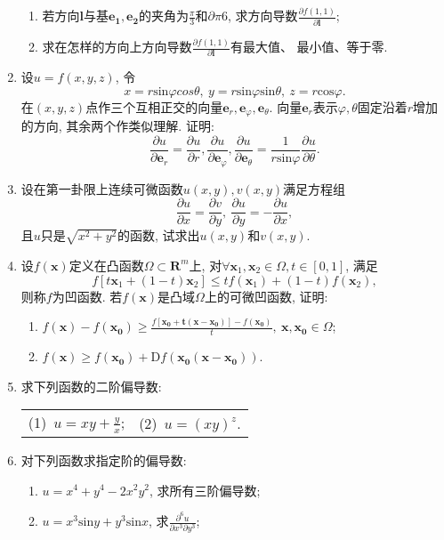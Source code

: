 \begin{enumerate}
\begin{enumerate}
	\item 若方向$\bm{l}$与基$\bm{e_1},\bm{e_2}$的夹角为$\frac{\pi}{3}$和$\partial{\pi}{6}$, 求方向导数$\frac{\partial f(1,1)}{\partial \bm{l}}$;
	\item 求在怎样的方向上方向导数$\frac{\partial f(1,1)}{\partial \bm{l}}$有最大值、 最小值、等于零.
\end{enumerate}
\item 设$u=f(x,y,z)$, 令
$$ x=r\mathrm{sin}\varphi cos\theta,\ y=r\mathrm{sin}\varphi \mathrm{sin}\theta,\ z= r\mathrm{cos}\varphi.$$
在$(x,y,z)$点作三个互相正交的向量$\bm{e}_r,\bm{e}_\varphi,\bm{e}_\theta$. 向量$\bm{e}_r$表示$\varphi, \theta$固定沿着$r$增加的方向, 其余两个作类似理解. 证明:
$$\frac{\partial u}{\partial \bm{e}_r}=\frac{\partial u}{\partial r}, \frac{\partial u}{\partial \bm{e}_\varphi}, \frac{\partial u}{\partial \bm{e}_\theta}=\frac{1}{r\mathrm{sin}\varphi}\frac{\partial u}{\partial \theta}.$$
\item 设在第一卦限上连续可微函数$u(x,y),v(x,y)$满足方程组
$$\frac{\partial u}{\partial x} = \frac{\partial v}{\partial y}, \ \frac{\partial u}{\partial y}=-\frac{\partial u}{\partial x},$$
且$u$只是$\sqrt{x^2+y^2}$的函数, 试求出$u(x,y)$和$v(x,y)$.
\item 设$f(\bm{x})$定义在凸函数$\Omega \subset \bm{R}^m$上, 对$\forall \bm{x}_1,\bm{x}_2\in \Omega , t\in [0,1]$, 满足$$
f[t\bm{x}_1+(1-t)\bm{x}_2]\le tf(\bm{x}_1) + (1-t)f(\bm{x}_2),$$
则称$f$为凹函数. 若$f(\bm{x})$是凸域$\Omega$上的可微凹函数, 证明:
\begin{enumerate}
	\item $f(\bm{x})-f(\bm{x_0})\ge \frac{f[\bm{x_0+t(\bm{x-x_0})}]-f(\bm{x_0})}{t}, \ \bm{x},\bm{x_0}\in \Omega$;
	\item $f(\bm{x})\ge f(\bm{x_0})+\mathrm{D}f(\bm{x_0}(\bm{x-x_0}))$.
\end{enumerate}
\item 求下列函数的二阶偏导数:
\begin{table}[H]
	\begin{tabular}{ll}
		(1)\ $u=xy+\frac{y}{x}$;\qquad \qquad \qquad \qquad \qquad &(2)\ $u=(xy)^z$.
	\end{tabular}
\end{table}
\item 对下列函数求指定阶的偏导数:
\begin{enumerate}
	\item $u=x^4+y^4-2x^2y^2$, 求所有三阶偏导数;
	\item $u=x^3\mathrm{sin}y+y^3\mathrm{sin}x$, 求$\frac{\partial^6 u}{\partial x^3 \partial y^3}$;

\end{enumerate}
\end{enumerate}
